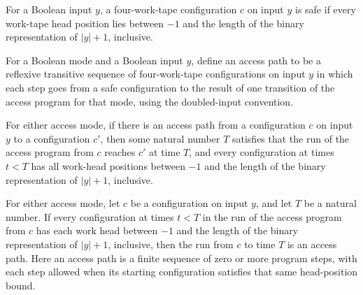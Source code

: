 \begin{definition}
\label{Complexity.LogProg.accessSafe}
\leanok
{}
For a Boolean input $y$, a four-work-tape configuration $c$ on input $y$ is safe if
every work-tape head position lies between $-1$ and the length of the binary
representation of $|y|+1$, inclusive.
\end{definition}

\begin{definition}
\label{Complexity.LogProg.AccessPath}
\leanok
{}
For a Boolean mode and a Boolean input $y$, define an access path to be a reflexive
transitive sequence of four-work-tape configurations on input $y$ in which each step
goes from a safe configuration to the result of one transition of the access program for
that mode, using the doubled-input convention.
\end{definition}

\begin{lemma}
\label{Complexity.LogProg.accessPath_run}
\leanok
{}
For either access mode, if there is an access path from a configuration $c$ on input $y$
to a configuration $c'$, then some natural number $T$ satisfies that the run of the
access program from $c$ reaches $c'$ at time $T$, and every configuration at times $t<T$
has all work-head positions between $-1$ and the length of the binary representation of
$|y|+1$, inclusive.
\end{lemma}

\begin{lemma}
\label{Complexity.LogProg.accessPath_of_run}
\leanok
{}
For either access mode, let $c$ be a configuration on input $y$, and let $T$ be a
natural number. If every configuration at times $t<T$ in the run of the access program
from $c$ has each work head between $-1$ and the length of the binary representation of
$|y|+1$, inclusive, then the run from $c$ to time $T$ is an access path. Here an access
path is a finite sequence of zero or more program steps, with each step allowed when its
starting configuration satisfies that same head-position bound.
\end{lemma}

